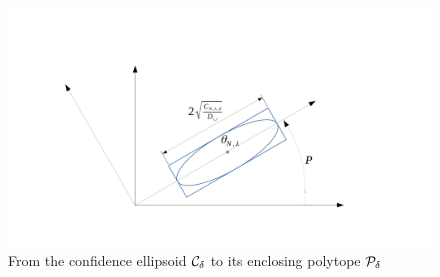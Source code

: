 \begin{subappendices}
	\begin{figure}
		\centering
		\includegraphics[trim={3.8cm, 2cm, 5cm, 3.8cm}, clip, width=0.7\linewidth]{img/ellipsoid_to_polytope}
		\caption{From the confidence ellipsoid $\mathcal{C}_\delta$ to its enclosing polytope $\mathcal{P}_\delta$}
		\label{fig:ellipsoid_to_polytope}
	\end{figure}
	

\end{subappendices}

